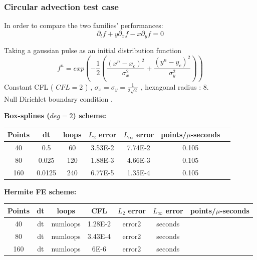 \documentclass[]{beamer}
\begin{document}
\begin{frame}
	\frametitle{Circular advection test case}
	
	In order to compare the two families' performances:
	\begin{equation}
		\partial_t f + y\partial_x f - x \partial_y f = 0 
	\end{equation}
	
	Taking a gaussian pulse as an initial distribution function
	\begin{equation}
	 f^{n} = exp  \left( -\dfrac{1}{2} \left( \dfrac{(x^n - x_c)^2}{\sigma_x^2} + \dfrac{(y^n - y_c)^2}{\sigma_y^2  } \right)   \right ) 
	\end{equation}
	Constant CFL (	$CFL = 2$ )  ,  $\sigma_x = \sigma_y = \frac{1}{2\sqrt{2}}$ , hexagonal radius : 8. \\
	Null Dirichlet boundary condition .
	
\end{frame}
\begin{frame}

	\textbf{Box-splines ($deg  = 2$) scheme:}
	\begin{center}
	\begin{tabular}{|c|c|c|c|c|c|c|}
		\hline
		 \textbf{Points} & \textbf{dt} & \textbf{loops}  & $L_2$ \textbf{error} & $L_\infty $ \textbf{error} & points/$\mu$-seconds \\
		\hline
		40   & 0.5         & 60   & 3.53E-2 & 7.74E-2  & 0.105 \\
		80   & 0.025    & 120 & 1.88E-3 & 4.66E-3 & 0.105 \\
		160 & 0.0125 & 240  & 6.77E-5 & 1.35E-4 & 0.105 \\
		\hline
	\end{tabular}
	\end{center}
	
	\textbf{Hermite FE scheme:}
	\begin{center}
	\begin{tabular}{|c|c|c|c|c|c|c|}
		\hline
		 \textbf{Points} & \textbf{dt} & \textbf{loops} & \textbf{CFL} & $L_2$ \textbf{error} & $L_\infty $ \textbf{error} & points/$\mu$-seconds \\
		\hline
		40   & dt & numloops & 1.28E-2 & error2  & seconds \\
		80   & dt & numloops & 3.43E-4& error2 & seconds \\
		160 & dt & numloops & 6E-6 & error2  & seconds \\
		\hline
	\end{tabular}
	\end{center}

\end{frame}
\end{document}
